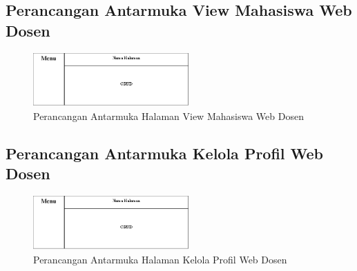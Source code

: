 \subsection{Perancangan Antarmuka View Mahasiswa Web Dosen}
	\begin{figure}[H]
		\includegraphics[width=6cm]{figures/diagram/image114.png}
		\centering
		\caption{Perancangan Antarmuka Halaman View Mahasiswa Web Dosen}
	\end{figure}
\subsection{Perancangan Antarmuka Kelola Profil Web Dosen}
	\begin{figure}[H]
		\includegraphics[width=6cm]{figures/diagram/image114.png}
		\centering
		\caption{Perancangan Antarmuka Halaman Kelola Profil  Web Dosen}
	\end{figure}
